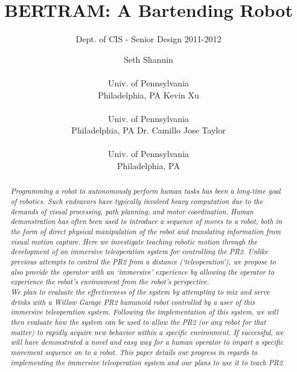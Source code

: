 \documentclass{sig-alternate}
\begin{document}
 

\title{BERTRAM: A Bartending Robot}

\subtitle{Dept. of CIS - Senior Design 2011-2012}
\author{
\alignauthor Seth Shannin \\  \\ Univ. of Pennsylvania \\ Philadelphia, PA
\alignauthor Kevin Xu \\  \\ Univ. of Pennsylvania \\ Philadelphia, PA
\alignauthor Dr. Camillo Jose Taylor \\  \\ Univ. of Pennsylvania \\ Philadelphia, PA}
\date{}
\maketitle

\begin{abstract}
\textit{\indent Programming a robot to autonomously perform human tasks has been a 
long-time goal of robotics. Such endeavors have typically involved heavy 
computation due to the demands of visual processing, path planning, and motor 
coordination. Human demonstration has often been used to introduce a sequence 
of moves to a robot, both in the form of direct physical manipulation of the 
robot and translating information from visual motion capture. Here we 
investigate teaching robotic motion through the development of an immersive
teleoperation system for controlling the PR2. Unlike previous attempts to
control the PR2 from a distance (`teleoperation'), we propose to also provide the
operator with an `immersive' experience by allowing the operator to experience the robot's
environment from the robot's perspective. \\
\indent We plan to evaluate the effectiveness of the system
by attempting to mix and serve drinks with a Willow Garage PR2 
humanoid robot controlled by a user of this immersive teleoperation system. Following the implementation of this system, we will then evaluate how the system can be used to allow
the PR2 (or any robot for that matter) to rapidly acquire new behavior within a specific environment. If successful, we will have demonstrated a novel and easy way for a
human operator to impart a specific movement sequence on to a robot. This paper details our progress in regards to implementing the immersive teleoperation system and our plans to use it to teach PR2.}
\end{abstract}
\end{document}
